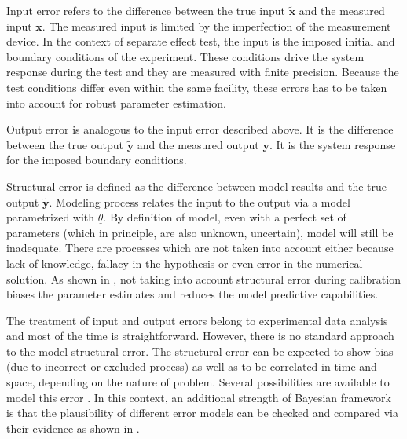 \documentclass[11pt,titlepage]{article}
\begin{document}
Input error refers to the difference between the true input $\mathbf{\tilde{x}}$ and the measured input $\mathbf{x}$. 
The measured input is limited by the imperfection of the measurement device. 
In the context of separate effect test, the input is the imposed initial and boundary conditions of the experiment. 
These conditions drive the system response during the test and they are measured with finite precision. 
Because the test conditions differ even within the same facility, these errors has to be taken into account for robust parameter estimation.

Output error is analogous to the input error described above. 
It is the difference between the true output $\mathbf{\tilde{y}}$ and the measured output $\mathbf{y}$. 
It is the system response for the imposed boundary conditions. 

Structural error is defined as the difference between model results and the true output $\mathbf{\tilde{y}}$. 
Modeling process relates the input to the output via a model parametrized with $\underline{\theta}$. 
By definition of model, even with a perfect set of parameters (which in principle, are also unknown, uncertain), model will still be inadequate. 
There are processes which are not taken into account either because lack of knowledge, fallacy in the hypothesis or even error in the numerical solution. 
As shown in \cite{KennedyOHagan2001}, not taking into account structural error during calibration biases the parameter estimates and reduces the model predictive capabilities.

The treatment of input and output errors belong to experimental data analysis and most of the time is straightforward. 
However, there is no standard approach to the model structural error. 
The structural error can be expected to show bias (due to incorrect or excluded process) as well as to be correlated in time and space, depending on the nature of problem. 
Several possibilities are available to model this error \cite{Simoen2013, Schoups2010}. 
In this context, an additional strength of Bayesian framework is that the plausibility of different error models can be checked and compared via their evidence as shown in \cite{Beck2010}.
\end{document}
